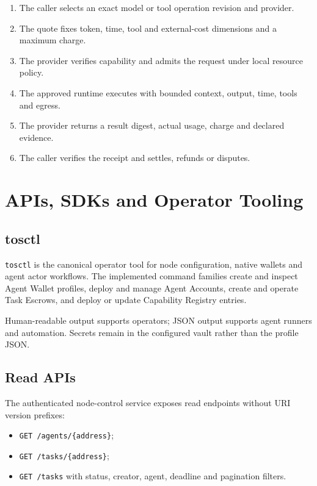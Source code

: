 \documentclass[11pt,oneside]{article}
\begin{document}
\begin{enumerate}
  \item The caller selects an exact model or tool operation revision and provider.
  \item The quote fixes token, time, tool and external-cost dimensions and a maximum charge.
  \item The provider verifies capability and admits the request under local resource policy.
  \item The approved runtime executes with bounded context, output, time, tools and egress.
  \item The provider returns a result digest, actual usage, charge and declared evidence.
  \item The caller verifies the receipt and settles, refunds or disputes.
\end{enumerate}
\section{APIs, SDKs and Operator Tooling}

\subsection{tosctl}

\texttt{tosctl} is the canonical operator tool for node configuration, native wallets and agent
actor workflows. The implemented command families create and inspect Agent Wallet profiles,
deploy and manage Agent Accounts, create and operate Task Escrows, and deploy or update
Capability Registry entries.

Human-readable output supports operators; JSON output supports agent runners and automation.
Secrets remain in the configured vault rather than the profile JSON.

\subsection{Read APIs}

The authenticated node-control service exposes read endpoints without URI version prefixes:

\begin{itemize}
  \item \texttt{GET /agents/\{address\}};
  \item \texttt{GET /tasks/\{address\}};
  \item \texttt{GET /tasks} with status, creator, agent, deadline and pagination filters.
\end{itemize}
\end{document}
